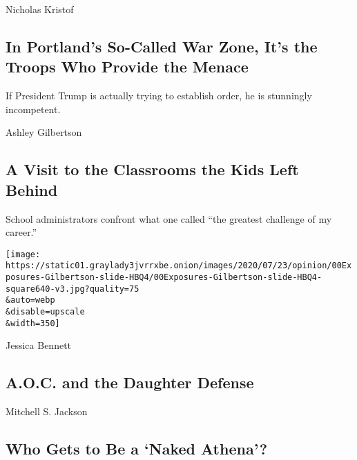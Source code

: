 Nicholas Kristof

\hypertarget{in-portlands-so-called-war-zone-its-the-troops-who-provide-the-menace}{%
\subsection{In Portland's So-Called War Zone, It's the Troops Who
Provide the
Menace}\label{in-portlands-so-called-war-zone-its-the-troops-who-provide-the-menace}}

If President Trump is actually trying to establish order, he is
stunningly incompetent.

\href{/2020/07/25/opinion/school-coronavirus-reopening.html}{}

Ashley Gilbertson

\hypertarget{a-visit-to-the-classrooms-the-kids-left-behind}{%
\subsection{A Visit to the Classrooms the Kids Left
Behind}\label{a-visit-to-the-classrooms-the-kids-left-behind}}

School administrators confront what one called ``the greatest challenge
of my career.''

\href{/2020/07/25/opinion/school-coronavirus-reopening.html}{}

\texttt{[image: https://static01.graylady3jvrrxbe.onion/images/2020/07/23/opinion/00Exposures-Gilbertson-slide-HBQ4/00Exposures-Gilbertson-slide-HBQ4-square640-v3.jpg?quality=75\\\&auto=webp\\\&disable=upscale\\\&width=350]}

\href{/2020/07/25/sunday-review/aoc-daughters-ted-yoho.html}{}

Jessica Bennett

\hypertarget{aoc-and-the-daughter-defense}{%
\subsection{A.O.C. and the Daughter
Defense}\label{aoc-and-the-daughter-defense}}

\href{/2020/07/25/opinion/sunday/portland-protests-white.html}{}

Mitchell S. Jackson

\hypertarget{who-gets-to-be-a-naked-athena}{%
\subsection{Who Gets to Be a `Naked
Athena'?}\label{who-gets-to-be-a-naked-athena}}


